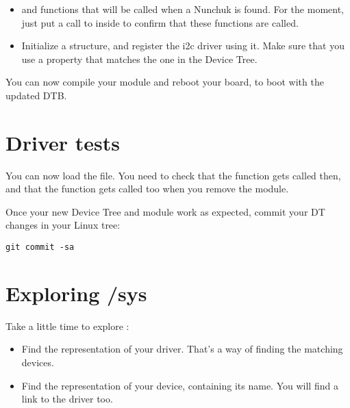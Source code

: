 \begin{itemize}
\item {} and  functions that will
      be called when a Nunchuk is found.
      For the moment, just put a call to  inside
      to confirm that these functions are called.
\item Initialize a  structure, and register
      the i2c driver using it. Make sure that you use
      a  property that matches the one in the
      Device Tree.
\end{itemize}

You can now compile your module and reboot your board, to
boot with the updated DTB.

\section{Driver tests}

You can now load the  file.
You need to check that the  function gets called
then, and that the  function gets called too
when you remove the module.

Once your new Device Tree and module work as expected, commit
your DT changes in your Linux tree:

\begin{verbatim}
git commit -sa
\end{verbatim}

\section{Exploring /sys}

Take a little time to explore :

\begin{itemize}
\item Find the representation of your driver. That's a way
      of finding the matching devices.
\item Find the representation of your device, containing its name.
      You will find a link to the driver too.
\end{itemize}
